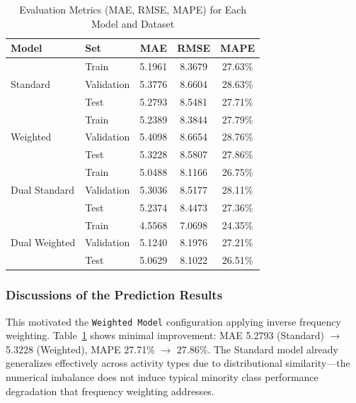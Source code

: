 \documentclass[preprint,12pt]{elsarticle}
\begin{document}
\begin{table}[H]
\centering
\caption{Evaluation Metrics (MAE, RMSE, MAPE) for Each Model and Dataset}
\label{tab:model_performance}
\begin{tabular}{llccc}
\toprule
\textbf{Model} & \textbf{Set} & \textbf{MAE} & \textbf{RMSE} & \textbf{MAPE} \\
\midrule
\multirow{3}{*}{Standard} 
    & Train & 5.1961 & 8.3679 & 27.63\% \\
    & Validation & 5.3776 & 8.6604 & 28.63\% \\
    & Test & 5.2793 & 8.5481 & 27.71\% \\
\midrule
\multirow{3}{*}{Weighted} 
    & Train & 5.2389 & 8.3844 & 27.79\% \\
    & Validation & 5.4098 & 8.6654 & 28.76\% \\
    & Test & 5.3228 & 8.5807 & 27.86\% \\
\midrule
\multirow{3}{*}{Dual Standard} 
    & Train & 5.0488 & 8.1166 & 26.75\% \\
    & Validation & 5.3036 & 8.5177 & 28.11\% \\
    & Test & 5.2374 & 8.4473 & 27.36\% \\
\midrule
\multirow{3}{*}{Dual Weighted} 
    & Train & 4.5568 & 7.0698 & 24.35\% \\
    & Validation & 5.1240 & 8.1976 & 27.21\% \\
    & Test & 5.0629 & 8.1022 & 26.51\% \\
\bottomrule
\end{tabular}
\end{table}

\subsubsection{Discussions of the Prediction Results}




This motivated the \texttt{Weighted Model} configuration applying inverse frequency weighting. Table~\ref{tab:model_performance} shows minimal improvement: MAE 5.2793 (Standard) $\rightarrow$ 5.3228 (Weighted), MAPE 27.71\% $\rightarrow$ 27.86\%. The Standard model already generalizes effectively across activity types due to distributional similarity—the numerical imbalance does not induce typical minority class performance degradation that frequency weighting addresses.

\end{document}
